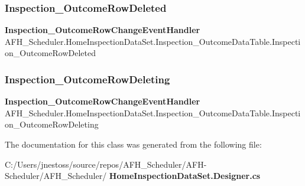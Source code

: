 \subsubsection{Inspection\_OutcomeRowDeleted}
{\footnotesize\ttfamily \textbf{ Inspection\+\_\+\+Outcome\+Row\+Change\+Event\+Handler} A\+F\+H\+\_\+\+Scheduler.\+Home\+Inspection\+Data\+Set.\+Inspection\+\_\+\+Outcome\+Data\+Table.\+Inspection\+\_\+\+Outcome\+Row\+Deleted}

\mbox{\label{class_a_f_h___scheduler_1_1_home_inspection_data_set_1_1_inspection___outcome_data_table_a1774027270a6935f7edb228174488242}} 
\subsubsection{Inspection\_OutcomeRowDeleting}
{\footnotesize\ttfamily \textbf{ Inspection\+\_\+\+Outcome\+Row\+Change\+Event\+Handler} A\+F\+H\+\_\+\+Scheduler.\+Home\+Inspection\+Data\+Set.\+Inspection\+\_\+\+Outcome\+Data\+Table.\+Inspection\+\_\+\+Outcome\+Row\+Deleting}



The documentation for this class was generated from the following file\+:\begin{DoxyCompactItemize}
\item 
C\+:/\+Users/jnestoss/source/repos/\+A\+F\+H\+\_\+\+Scheduler/\+A\+F\+H-\/\+Scheduler/\+A\+F\+H\+\_\+\+Scheduler/\textbf{ Home\+Inspection\+Data\+Set.\+Designer.\+cs}\end{DoxyCompactItemize}
